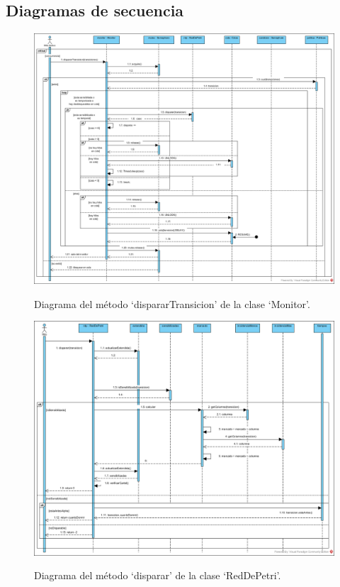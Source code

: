 \documentclass[12pt,a4paper]{article}
\begin{document}
\subsection{Diagramas de secuencia}
\begin{figure}[H]
    \centering
    \includegraphics[scale=0.35]{DSmonitor.png}
    \label{fig:dsmonitor}
    \caption{Diagrama del método `dispararTransicion' de la clase `Monitor'.}
\end{figure}

\begin{figure}[H]
    \centering
    \includegraphics[scale=0.35]{DSdisparo.png}
    \label{fig:dsdisparo}
    \caption{Diagrama del método `disparar' de la clase `RedDePetri'.}
\end{figure}
\end{document}
